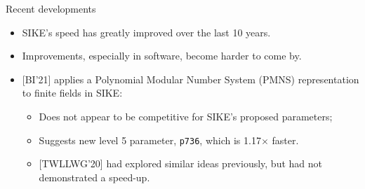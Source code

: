 \documentclass[aspectratio=169]{beamer}
\renewcommand{\emph}[1]{{\usebeamercolor[fg]{structure}#1}}
\begin{document}
\begin{frame}{Recent developments}
  \vfill
  \begin{itemize}
  \item SIKE's speed has greatly improved over the last 10 years.
  \item Improvements, especially in software, become harder to come by.
  \item {[BI'21]} applies a \emph{Polynomial Modular Number System
      (PMNS)} representation to finite fields in SIKE:
    \begin{itemize}
    \item Does not appear to be competitive for SIKE's proposed
      parameters;
    \item Suggests new level 5 parameter, \texttt{p736}, which is
      1.17$\times$ faster.
    \item {[TWLLWG'20]} had explored similar ideas previously, but had
      not demonstrated a speed-up.
    \end{itemize}
  \end{itemize}
  
\end{frame}

\end{document}
